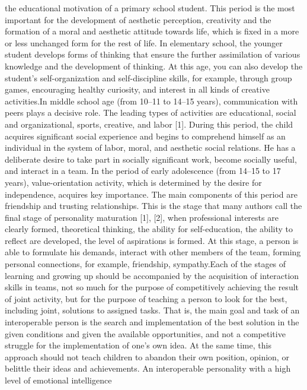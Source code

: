 \documentclass[twocolumn]{article}
\begin{document}
the educational motivation of a primary school student.
This period is the most important for the development
of aesthetic perception, creativity and the formation of a
moral and aesthetic attitude towards life, which is fixed
in a more or less unchanged form for the rest of life. In
elementary school, the younger student develops forms
of thinking that ensure the further assimilation of various
knowledge and the development of thinking. At this age,
you can also develop the student’s self-organization and
self-discipline skills, for example, through group games,
encouraging healthy curiosity, and interest in all kinds of
creative activities.In middle school age (from 10–11 to 14–15 years),
communication with peers plays a decisive role. The
leading types of activities are educational, social and
organizational, sports, creative, and labor [1]. During this
period, the child acquires significant social experience
and begins to comprehend himself as an individual in the
system of labor, moral, and aesthetic social relations. He
has a deliberate desire to take part in socially significant
work, become socially useful, and interact in a team.
In the period of early adolescence (from 14–15 to
17 years), value-orientation activity, which is determined
by the desire for independence, acquires key importance.
The main components of this period are friendship and
trusting relationships. This is the stage that many authors
call the final stage of personality maturation [1], [2],
when professional interests are clearly formed, theoretical
thinking, the ability for self-education, the ability to
reflect are developed, the level of aspirations is formed.
At this stage, a person is able to formulate his demands,
interact with other members of the team, forming personal connections, for example, friendship, sympathy.Each of the stages of learning and growing up should
be accompanied by the acquisition of interaction skills
in teams, not so much for the purpose of competitively
achieving the result of joint activity, but for the purpose
of teaching a person to look for the best, including
joint, solutions to assigned tasks. That is, the main
goal and task of an interoperable person is the search
and implementation of the best solution in the given
conditions and given the available opportunities, and not
a competitive struggle for the implementation of one’s
own idea. At the same time, this approach should not
teach children to abandon their own position, opinion, or
belittle their ideas and achievements. An interoperable
personality with a high level of emotional intelligence
\end{document}
